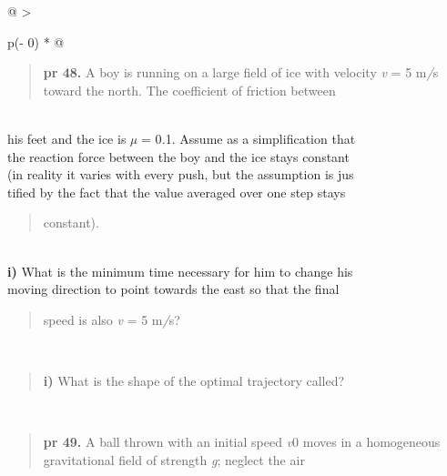 \documentclass[
]{article}
\begin{document}
\begin{longtable}[]{@{}
  >{\raggedright\arraybackslash}p{(\columnwidth - 0\tabcolsep) * }@{}}
\toprule
\begin{minipage}[b]{\linewidth}\raggedright
\begin{quote}
\textbf{pr 48.} A boy is running on a large ﬁeld of ice with velocity
\emph{v} = 5 m\emph{/}s toward the north. The coeﬃcient of friction
between
\end{quote}
\end{minipage} \\
\midrule
\endhead
his feet and the ice is \emph{µ} = 0\emph{.}1. Assume as a simpliﬁcation
that \\
the reaction force between the boy and the ice stays constant \\
(in reality it varies with every push, but the assumption is jus \\
tiﬁed by the fact that the value averaged over one step stays \\
\begin{minipage}[t]{\linewidth}\raggedright
\begin{quote}
constant).
\end{quote}
\end{minipage} \\
\textbf{i)} What is the minimum time necessary for him to change his \\
moving direction to point towards the east so that the ﬁnal \\
\begin{minipage}[t]{\linewidth}\raggedright
\begin{quote}
speed is also \emph{v} = 5 m\emph{/}s?
\end{quote}
\end{minipage} \\
\begin{minipage}[t]{\linewidth}\raggedright
\begin{quote}
\textbf{i)} What is the shape of the optimal trajectory called?
\end{quote}
\end{minipage} \\
\begin{minipage}[t]{\linewidth}\raggedright
\begin{quote}
\textbf{pr 49.} A ball thrown with an initial speed \emph{v}0 moves in a
homogeneous gravitational ﬁeld of strength \emph{g}; neglect the air
\end{quote}
\end{minipage} \\

\end{longtable}
\end{document}

